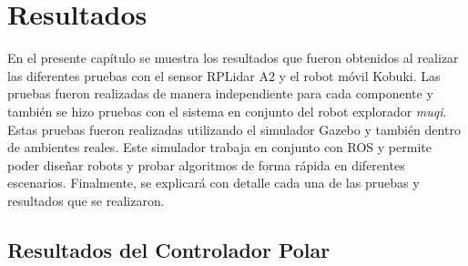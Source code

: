 \chapter{Resultados}
En el presente capítulo se muestra los resultados que fueron obtenidos al realizar
las diferentes pruebas con el sensor RPLidar A2 y el robot móvil Kobuki. Las pruebas
fueron realizadas de manera independiente para cada componente y también se hizo pruebas 
con el sistema en conjunto del robot explorador \textit{muqi}. Estas pruebas fueron 
realizadas utilizando el simulador Gazebo y también dentro de ambientes reales. Este simulador trabaja en conjunto con ROS y permite poder diseñar robots y 
probar algoritmos de forma rápida en diferentes escenarios. Finalmente, se explicará
con detalle cada una de las pruebas y resultados que se realizaron.


\section {Resultados del Controlador Polar}

